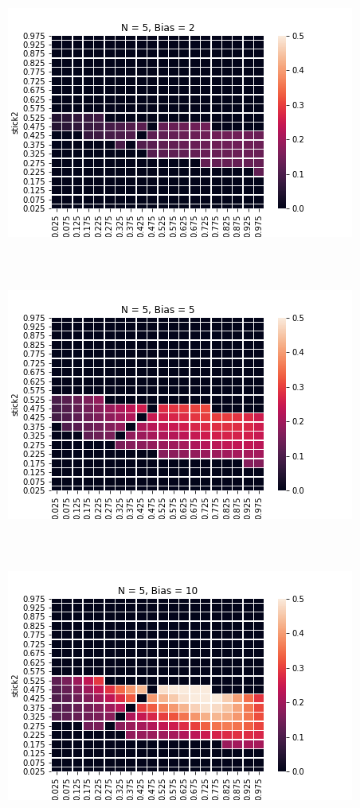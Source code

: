 \documentclass[10pt,letterpaper]{article}
\begin{document}
\begin{figure}[h]
\begin{subfigure}{0.3\linewidth}
	\includegraphics[width=\linewidth]{figures/nSticks5bias2.png}
\end{subfigure}
~
\begin{subfigure}{0.3\linewidth}
	\includegraphics[width=\linewidth]{figures/nSticks5bias5.png}
\end{subfigure}
~
\begin{subfigure}{0.3\linewidth}
	\includegraphics[width=\linewidth]{figures/nSticks5bias10.png}

\end{subfigure}
\end{figure}
\end{document}
